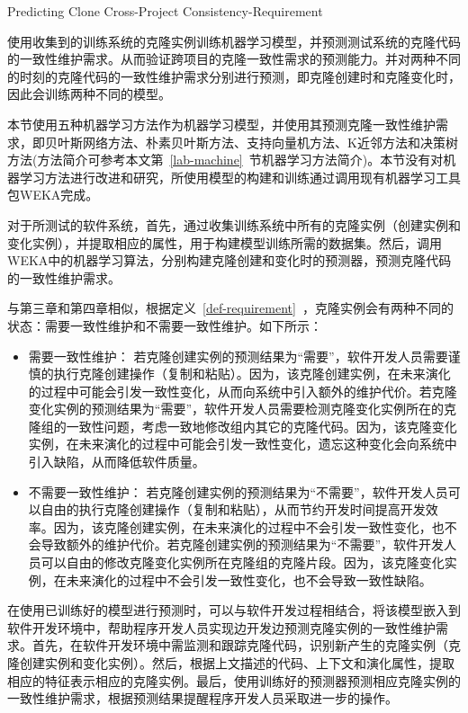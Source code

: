 {Predicting Clone Cross-Project Consistency-Requirement}


使用收集到的训练系统的克隆实例训练机器学习模型，并预测测试系统的克隆代码的一致性维护需求。从而验证跨项目的克隆一致性需求的预测能力。并对两种不同的时刻的克隆代码的一致性维护需求分别进行预测，即克隆创建时和克隆变化时，因此会训练两种不同的模型。

本节使用五种机器学习方法作为机器学习模型，并使用其预测克隆一致性维护需求，即贝叶斯网络方法、朴素贝叶斯方法、支持向量机方法、K近邻方法和决策树方法(方法简介可参考本文第~\ref{lab-machine}~节机器学习方法简介)。本节没有对机器学习方法进行改进和研究，所使用模型的构建和训练通过调用现有机器学习工具包WEKA完成。

对于所测试的软件系统，首先，通过收集训练系统中所有的克隆实例（创建实例和变化实例），并提取相应的属性，用于构建模型训练所需的数据集。然后，调用WEKA中的机器学习算法，分别构建克隆创建和变化时的预测器，预测克隆代码的一致性维护需求。

与第三章和第四章相似，根据定义~\ref{def-requirement}~，克隆实例会有两种不同的状态：需要一致性维护和不需要一致性维护。如下所示：
\begin{itemize}
\item 
需要一致性维护：
若克隆创建实例的预测结果为“需要”，软件开发人员需要谨慎的执行克隆创建操作（复制和粘贴）。因为，该克隆创建实例，在未来演化的过程中可能会引发一致性变化，从而向系统中引入额外的维护代价。若克隆变化实例的预测结果为“需要”，软件开发人员需要检测克隆变化实例所在的克隆组的一致性问题，考虑一致地修改组内其它的克隆代码。因为，该克隆变化实例，在未来演化的过程中可能会引发一致性变化，遗忘这种变化会向系统中引入缺陷，从而降低软件质量。
\item
不需要一致性维护：
若克隆创建实例的预测结果为“不需要”，软件开发人员可以自由的执行克隆创建操作（复制和粘贴），从而节约开发时间提高开发效率。因为，该克隆创建实例，在未来演化的过程中不会引发一致性变化，也不会导致额外的维护代价。若克隆创建实例的预测结果为“不需要”，软件开发人员可以自由的修改克隆变化实例所在克隆组的克隆片段。因为，该克隆变化实例，在未来演化的过程中不会引发一致性变化，也不会导致一致性缺陷。
\end{itemize}

在使用已训练好的模型进行预测时，可以与软件开发过程相结合，将该模型嵌入到软件开发环境中，帮助程序开发人员实现边开发边预测克隆实例的一致性维护需求。首先，在软件开发环境中需监测和跟踪克隆代码，识别新产生的克隆实例（克隆创建实例和变化实例）。然后，根据上文描述的代码、上下文和演化属性，提取相应的特征表示相应的克隆实例。最后，使用训练好的预测器预测相应克隆实例的一致性维护需求，根据预测结果提醒程序开发人员采取进一步的操作。

